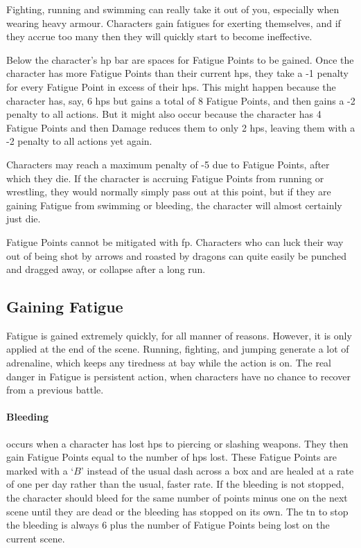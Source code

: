 \begin{multicols}{2}

\label{fatigue}
\noindent
Fighting, running and swimming can really take it out of you, especially when wearing heavy armour.
Characters gain \glspl{fatigue} for exerting themselves, and if they accrue too many then they will quickly start to become ineffective.

Below the character's \gls{hp} bar are spaces for Fatigue Points to be gained.
Once the character has more Fatigue Points than their current \glspl{hp}, they take a -1 penalty for every Fatigue Point in excess of their \glspl{hp}.
 This might happen because the character has, say, 6 \glspl{hp} but gains a total of 8 Fatigue Points, and then gains a -2 penalty to all actions.
But it might also occur because the character has 4 Fatigue Points and then Damage reduces them to only 2 \glspl{hp}, leaving them with a -2 penalty to all actions yet again.

Characters may reach a maximum penalty of -5 due to Fatigue Points, after which they die. If the character is accruing Fatigue Points from running or wrestling, they would normally simply pass out at this point, but if they are gaining Fatigue from swimming or bleeding, the character will almost certainly just die.

Fatigue Points cannot be mitigated with \gls{fp}. Characters who can luck their way out of being shot by arrows and roasted by dragons can quite easily be punched and dragged away, or collapse after a long run.

\subsection{Gaining Fatigue}

\begin{figure}[t]
	\fatiguechart
\end{figure}

Fatigue is gained extremely quickly, for all manner of reasons.
However, it is only applied at the end of the scene.
Running, fighting, and jumping generate a lot of adrenaline, which keeps any tiredness at bay while the action is on.
The real danger in Fatigue is persistent action, when characters have no chance to recover from a previous battle.

\paragraph{Bleeding} occurs when a character has lost \glspl{hp} to piercing or slashing weapons.
They then gain Fatigue Points equal to the number of \glspl{hp} lost.
These Fatigue Points are marked with a `$B$' instead of the usual dash across a box and are healed at a rate of one per day rather than the usual, faster rate.
If the bleeding is not stopped, the character should bleed for the same number of points minus one on the next scene until they are dead or the bleeding has stopped on its own.
The \gls{tn} to stop the bleeding is always 6 plus the number of Fatigue Points being lost on the current scene.


\end{multicols}
